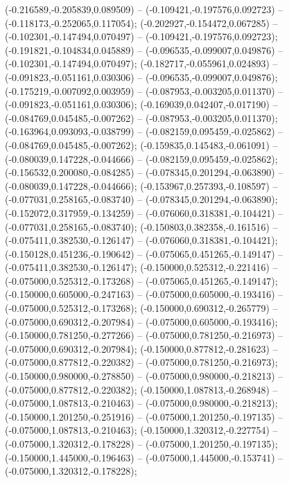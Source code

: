  (-0.216589,-0.205839,0.089509) -- (-0.109421,-0.197576,0.092723) -- (-0.118173,-0.252065,0.117054);
 (-0.202927,-0.154472,0.067285) -- (-0.102301,-0.147494,0.070497) -- (-0.109421,-0.197576,0.092723);
 (-0.191821,-0.104834,0.045889) -- (-0.096535,-0.099007,0.049876) -- (-0.102301,-0.147494,0.070497);
 (-0.182717,-0.055961,0.024893) -- (-0.091823,-0.051161,0.030306) -- (-0.096535,-0.099007,0.049876);
 (-0.175219,-0.007092,0.003959) -- (-0.087953,-0.003205,0.011370) -- (-0.091823,-0.051161,0.030306);
 (-0.169039,0.042407,-0.017190) -- (-0.084769,0.045485,-0.007262) -- (-0.087953,-0.003205,0.011370);
 (-0.163964,0.093093,-0.038799) -- (-0.082159,0.095459,-0.025862) -- (-0.084769,0.045485,-0.007262);
 (-0.159835,0.145483,-0.061091) -- (-0.080039,0.147228,-0.044666) -- (-0.082159,0.095459,-0.025862);
 (-0.156532,0.200080,-0.084285) -- (-0.078345,0.201294,-0.063890) -- (-0.080039,0.147228,-0.044666);
 (-0.153967,0.257393,-0.108597) -- (-0.077031,0.258165,-0.083740) -- (-0.078345,0.201294,-0.063890);
 (-0.152072,0.317959,-0.134259) -- (-0.076060,0.318381,-0.104421) -- (-0.077031,0.258165,-0.083740);
 (-0.150803,0.382358,-0.161516) -- (-0.075411,0.382530,-0.126147) -- (-0.076060,0.318381,-0.104421);
 (-0.150128,0.451236,-0.190642) -- (-0.075065,0.451265,-0.149147) -- (-0.075411,0.382530,-0.126147);
 (-0.150000,0.525312,-0.221416) -- (-0.075000,0.525312,-0.173268) -- (-0.075065,0.451265,-0.149147);
 (-0.150000,0.605000,-0.247163) -- (-0.075000,0.605000,-0.193416) -- (-0.075000,0.525312,-0.173268);
 (-0.150000,0.690312,-0.265779) -- (-0.075000,0.690312,-0.207984) -- (-0.075000,0.605000,-0.193416);
 (-0.150000,0.781250,-0.277266) -- (-0.075000,0.781250,-0.216973) -- (-0.075000,0.690312,-0.207984);
 (-0.150000,0.877812,-0.281623) -- (-0.075000,0.877812,-0.220382) -- (-0.075000,0.781250,-0.216973);
 (-0.150000,0.980000,-0.278850) -- (-0.075000,0.980000,-0.218213) -- (-0.075000,0.877812,-0.220382);
 (-0.150000,1.087813,-0.268948) -- (-0.075000,1.087813,-0.210463) -- (-0.075000,0.980000,-0.218213);
 (-0.150000,1.201250,-0.251916) -- (-0.075000,1.201250,-0.197135) -- (-0.075000,1.087813,-0.210463);
 (-0.150000,1.320312,-0.227754) -- (-0.075000,1.320312,-0.178228) -- (-0.075000,1.201250,-0.197135);
 (-0.150000,1.445000,-0.196463) -- (-0.075000,1.445000,-0.153741) -- (-0.075000,1.320312,-0.178228);
